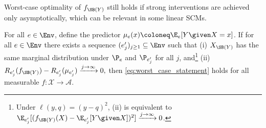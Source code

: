 
Worst-case optimality of $f_{\SB(Y)}$ still holds if strong interventions are achieved only asymptotically, which can be relevant in some linear SCMs. 
\begin{proposition}
\label{prop:asymptotic}
For all $e \in \Env$, define the predictor $\mu_e(x) \coloneq \E_e[Y \given X = x]$. If for
all $e \in \Env$ there exists a sequence
$(e'_j)_{j \geq 1} \subseteq \Env$ such that (i) $X_{\SB(Y)}$ has the same marginal distribution under $\P_e$ and $\P_{e'_j}$ for all $j$, and\footnote{Under $\ell(y,q) = (y-q)^2$, (ii) is equivalent to $\E_{e'_j} [(f_{\SB(Y)}(X)-\E_{e'_j}[Y \given X] )^2] \xrightarrow{j \to \infty} 0$.} (ii) $R_{e'_j} (f_{\SB(Y)})
        - R_{e'_j}(\mu_{e'_j})
        \xrightarrow{j \to \infty} 0,$
then \eqref{eq:worst_case_statement} holds for all measurable
$f \colon \mathcal{X} \to \mathcal{A}$.
\end{proposition}





